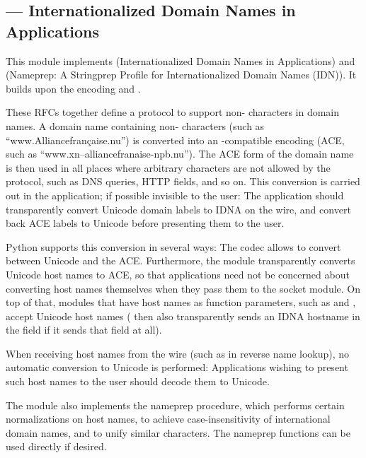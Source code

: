 \subsection{ ---
            Internationalized Domain Names in Applications}



This module implements  (Internationalized Domain Names in
Applications) and  (Nameprep: A Stringprep Profile for
Internationalized Domain Names (IDN)). It builds upon the
 encoding and .

These RFCs together define a protocol to support non-\ASCII{} characters
in domain names. A domain name containing non-\ASCII{} characters (such
as ``www.Alliancefran\c caise.nu'') is converted into an
\ASCII-compatible encoding (ACE, such as
``www.xn--alliancefranaise-npb.nu''). The ACE form of the domain name
is then used in all places where arbitrary characters are not allowed
by the protocol, such as DNS queries, HTTP  fields, and so
on. This conversion is carried out in the application; if possible
invisible to the user: The application should transparently convert
Unicode domain labels to IDNA on the wire, and convert back ACE labels
to Unicode before presenting them to the user.

Python supports this conversion in several ways: The  codec
allows to convert between Unicode and the ACE. Furthermore, the
 module transparently converts Unicode host names to
ACE, so that applications need not be concerned about converting host
names themselves when they pass them to the socket module. On top of
that, modules that have host names as function parameters, such as
 and , accept Unicode host names
( then also transparently sends an IDNA hostname in
the  field if it sends that field at all). 

When receiving host names from the wire (such as in reverse name
lookup), no automatic conversion to Unicode is performed: Applications
wishing to present such host names to the user should decode them to
Unicode.

The module  also implements the nameprep
procedure, which performs certain normalizations on host names, to
achieve case-insensitivity of international domain names, and to unify
similar characters. The nameprep functions can be used directly if
desired.

